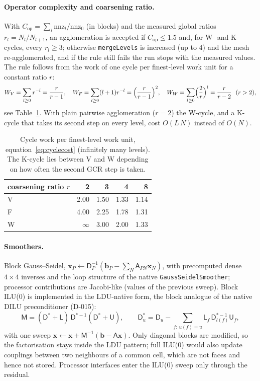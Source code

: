 \documentclass[11pt,a4paper]{article}
\newcommand{\vect}[1]{\mathbf{#1}}
\newcommand{\code}[1]{\texttt{#1}}
\begin{document}
\paragraph{Operator complexity and coarsening ratio.} With
$C_{\mathrm{op}}=\sum_l\mathrm{nnz}_l/\mathrm{nnz}_0$ (in blocks) and the
measured global ratios $r_l=N_l/N_{l+1}$, an agglomeration is accepted if
$C_{\mathrm{op}}\le1.5$ and, for W- and K-cycles, every $r_l\ge3$; otherwise
\code{mergeLevels} is increased (up to 4) and the mesh re-agglomerated, and
if the rule still fails the run stops with the measured values. The rule
follows from the work of one cycle per finest-level work unit for a constant
ratio $r$:
\begin{equation}
  W_V=\sum_{l\ge0}r^{-l}=\frac{r}{r-1},\quad
  W_F=\sum_{l\ge0}(l+1)r^{-l}=\Bigl(\frac{r}{r-1}\Bigr)^{2},\quad
  W_W=\sum_{l\ge0}\Bigl(\frac2r\Bigr)^{l}=\frac{r}{r-2}\ \ (r>2),
  \label{eq:cyclecost}
\end{equation}
see Table~\ref{tab:cyclecost}. With plain pairwise agglomeration ($r=2$) the
W-cycle, and a K-cycle that takes its second step on every level, cost
$O(L\,N)$ instead of $O(N)$.

\begin{table}[tbp]
\centering\small
\caption{Cycle work per finest-level work unit, equation~\eqref{eq:cyclecost}
(infinitely many levels). The K-cycle lies between V and W depending on how
often the second GCR step is taken.}
\label{tab:cyclecost}
\begin{tabular}{lrrrr}
\toprule
coarsening ratio $r$ & 2 & 3 & 4 & 8\\
\midrule
V & 2.00 & 1.50 & 1.33 & 1.14\\
F & 4.00 & 2.25 & 1.78 & 1.31\\
W & $\infty$ & 3.00 & 2.00 & 1.33\\
\bottomrule
\end{tabular}
\end{table}

\paragraph{Smoothers.} Block Gauss--Seidel,
$\vect x_P\leftarrow\mathsf D_P^{-1}(\vect b_P-\sum_N\mathsf A_{PN}\vect x_N)$,
with precomputed dense $4\times4$ inverses and the loop structure of the
native \code{GaussSeidelSmoother}; processor contributions are Jacobi-like
(values of the previous sweep). Block ILU(0) is implemented in the LDU-native
form, the block analogue of the native DILU preconditioner (D-015):
\begin{equation}
  \mathsf M=(\mathsf D^\ast+\mathsf L)\,\mathsf D^{\ast-1}(\mathsf D^\ast+\mathsf U),\qquad
  \mathsf D^\ast_u=\mathsf D_u-\sum_{f:\,u(f)=u}\mathsf L_f\,\mathsf D^{\ast-1}_{l(f)}\mathsf U_f,
\end{equation}
with one sweep $\vect x\leftarrow\vect x+\mathsf M^{-1}(\vect b-\mathsf A\vect x)$.
Only diagonal blocks are modified, so the factorisation stays inside the LDU
pattern; full ILU(0) would also update couplings between two neighbours of a
common cell, which are not faces and hence not stored. Processor interfaces
enter the ILU(0) sweep only through the residual.
\end{document}
